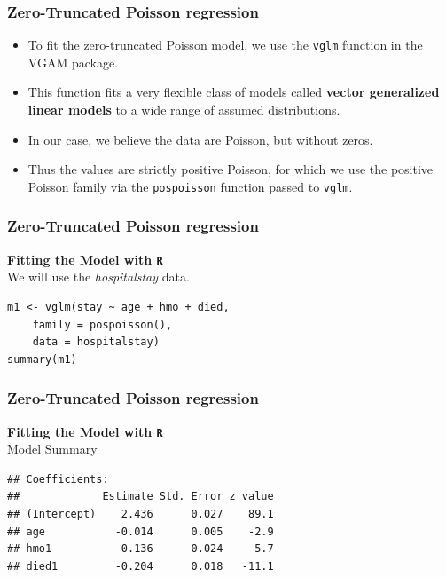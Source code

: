 \documentclass[MASTER.tex]{subfiles}
\begin{document}
\begin{frame}[fragile]
	\frametitle{Zero-Truncated Poisson regression}
\large
\begin{itemize}
\item To fit the zero-truncated Poisson model, we use the \texttt{vglm} function in the VGAM package. 
\item This function fits a very flexible class of models called \textbf{vector generalized linear models} to a wide range of assumed distributions. 
\item In our case, we believe the data are Poisson, but without zeros. 
\item Thus the values are strictly positive Poisson, for which we use the positive Poisson family via the \texttt{pospoisson} function passed to \texttt{vglm}.
\end{itemize}
\end{frame}
\begin{frame}[fragile]
	\frametitle{Zero-Truncated Poisson regression}
\large
\textbf{Fitting the Model with \texttt{R}}\\
We will use the \textit{hospitalstay} data.
\begin{verbatim}
m1 <- vglm(stay ~ age + hmo + died, 
    family = pospoisson(), 
    data = hospitalstay)
summary(m1)
\end{verbatim}
\end{frame}


\begin{frame}[fragile]
	\frametitle{Zero-Truncated Poisson regression}
	\large
	\textbf{Fitting the Model with \texttt{R}}\\
	Model Summary
	\begin{verbatim}
## Coefficients:
##             Estimate Std. Error z value
## (Intercept)    2.436      0.027    89.1
## age           -0.014      0.005    -2.9
## hmo1          -0.136      0.024    -5.7
## died1         -0.204      0.018   -11.1
	\end{verbatim}
\end{frame}
\end{document}
